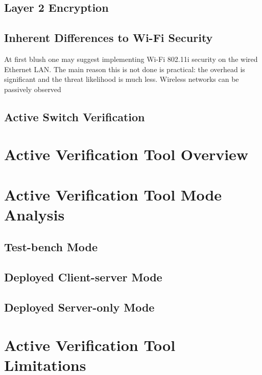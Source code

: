 \documentclass[journal]{IEEEtran}
\begin{document}
\subsection{Layer 2 Encryption}

\subsection{Inherent Differences to Wi-Fi Security}
At first blush one may suggest implementing Wi-Fi 802.11i security on the wired Ethernet LAN. The
main reason this is not done is practical: the overhead is significant and the threat likelihood
is much less. Wireless networks can be passively observed

\subsection{Active Switch Verification}


\section{Active Verification Tool Overview}


\section{Active Verification Tool Mode Analysis}

\subsection{Test-bench Mode}

\subsection{Deployed Client-server Mode}

\subsection{Deployed Server-only Mode}


\section{Active Verification Tool Limitations}
\end{document}
